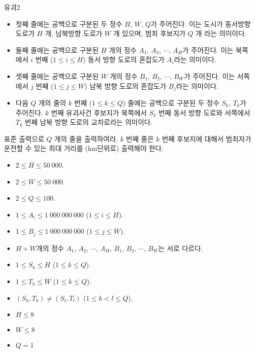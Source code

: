 \begin{problem}{유괴2}
	\begin{itemize}
		\item 첫째 줄에는 공백으로 구분된 두 정수 $H$, $W$, $Q$가 주어진다. 이는 도시가 동서방향 도로가 $H$ 개, 남북방향 도로가 $W$ 개 있으며, 범죄 후보지가 $Q$ 개 라는 의미이다.
		\item 둘째 줄에는 공백으로 구분된 $H$ 개의 정수 $A_1$, $A_2$, $\cdots$, $A_H$가 주어진다. 이는 북쪽에서 $i$ 번째 ($1 \le i \le H$) 동서 방향 도로의 혼잡도가 $A_i$라는 의미이다.
		\item 셋째 줄에는 공백으로 구분된 $W$ 개의 정수 $B_1$, $B_2$, $\cdots$, $B_W$가 주어진다. 이는 서쪽에서 $j$ 번째 ($1 \le j \le W$) 남북 방향 도로의 혼잡도가 $B_j$라는 의미이다.
		\item 다음 $Q$ 개의 줄의 $k$ 번째 ($1 \le k \le Q$) 줄에는 공백으로 구분된 두 정수 $S_k$, $T_k$가 주어진다. $k$ 번째 유괴사건 후보지가 북쪽에서 $S_k$ 번째 동서 방향 도로와 서쪽에서 $T_k$ 번째 남북 방향 도로의 교차로라는 의미이다.
	\end{itemize}

	
	\OutputFile
	
	표준 출력으로 $Q$ 개의 줄을 출력하여라. $k$ 번째 줄은 $k$ 번째 후보지에 대해서 범죄자가 운전할 수 있는 최대 거리를 (km단위로) 출력해야 한다.
	
	\Constraints
	
	\begin{itemize}
	
	\item $2 \le H \le 50\ 000$.	
	\item $2 \le W \le 50\ 000$.	
	\item $2 \le Q \le 100$.	
	\item $1 \le A_i \le 1\ 000\ 000\ 000$ ($1 \le i \le H$).	
	\item $1 \le B_j \le 1\ 000\ 000\ 000$ ($1 \le j \le W$).
	\item $H+W$개의 정수 $A_1$, $A_2$, $\cdots$, $A_H$, $B_1$, $B_2$, $\cdots$, $B_W$는 서로 다르다.
	\item $1 \le S_k \le H$ ($1 \le k \le Q$).
	\item $1 \le T_k \le W$ ($1 \le k \le Q$).
	\item $(S_k, T_k) \ne (S_l, T_l)$ ($1 \le k < l \le Q$).
	\end{itemize}
	
	
	\begin{itemize}
		\item $H \le 8$
		\item $W \le 8$
		\item $Q = 1$
	\end{itemize}



\end{problem}

